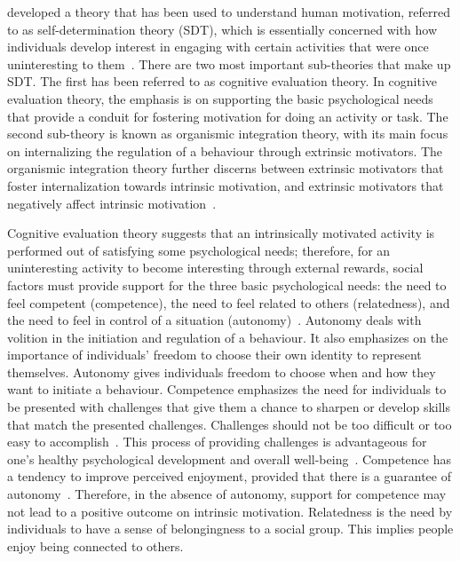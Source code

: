 \cite{deci1985:intrinsic} developed a theory that has been used to understand human motivation, referred to as self-determination theory (SDT), which is essentially concerned with how individuals develop interest in engaging with certain activities that were once uninteresting to them~\citep{ryan2000intrinsic}. There are two most important sub-theories that make up SDT. The first has been referred to as cognitive evaluation theory. In cognitive evaluation theory, the emphasis is on supporting the basic psychological needs that provide a conduit for fostering motivation for doing an activity or task. The second sub-theory is known as organismic integration theory, with its main focus on internalizing the regulation of a behaviour through extrinsic motivators. The organismic integration theory further discerns between extrinsic motivators that foster internalization towards intrinsic motivation, and extrinsic motivators that negatively affect intrinsic motivation~\citep{ryan2000:self,lee2015:relating}.

Cognitive evaluation theory suggests that an intrinsically motivated activity is performed out of satisfying some psychological needs; therefore, for an uninteresting activity to become interesting through external rewards, social factors must provide support for the three basic psychological needs: the need to feel competent (competence), the need to feel related to others (relatedness), and the need to feel in control of a situation (autonomy)~\citep{ryan2000intrinsic}. Autonomy deals with volition in the initiation and regulation of a behaviour. It also emphasizes on the importance of individuals' freedom to choose their own identity to represent themselves. Autonomy gives individuals freedom to choose when and how they want to initiate a behaviour. Competence emphasizes the need for individuals to be presented with challenges that give them a chance to sharpen or develop skills that match the presented challenges. Challenges should not be too difficult or too easy to accomplish~\citep{zhang2008motivational,colineau2011motivating}. This process of providing challenges is advantageous for one's healthy psychological development and  overall well-being~\citep{zhang2008motivational}. Competence has a tendency to improve perceived enjoyment, provided that there is a guarantee of autonomy~\citep{forde2015informational}. Therefore, in the absence of autonomy, support for competence may not lead to a positive outcome on intrinsic motivation. Relatedness is the need by individuals to have a sense of belongingness to a social group. This implies people enjoy being connected to others.

